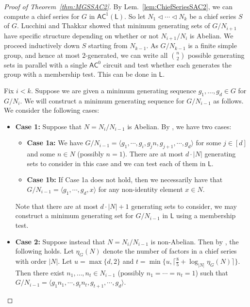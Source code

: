 \documentclass{theoretics}
\newcommand{\Lem}[1]{Lem.~\ref{#1}\xspace}
\newcommand*{\ComplexityClass}[1]{\ensuremath{\mathsf{#1}}\xspace}
\newcommand*{\LogSpace}{\ComplexityClass{L}}
\newcommand{\AC}{\ComplexityClass{AC}}
\begin{document}
\begin{proof}[Proof of Theorem~\ref{thm:MGSSAC2}]
By \Lem{lem:ChiefSeriesSAC2}, we can compute a chief series for $G$ in $\AC^{1}(\LogSpace)$. So let $N_1 \triangleleft \cdots \triangleleft N_k$ be a chief series $S$ of $G$.  Lucchini and Thakkar \cite{LucchiniThakkar} showed that minimum generating sets of $G / N_{i+1}$ have specific structure depending on whether or not $N_{i+1}/N_{i}$ is Abelian. We proceed inductively down $S$ starting from $N_{k-1}$. As $G / N_{k-1}$ is a finite simple group, and hence at most $2$-generated, we can write all $\binom{n}{2}$ possible generating sets in parallel with a single $\AC^0$ circuit and test whether each generates the group with a membership test. This can be done in $\LogSpace$. 

Fix $i < k$. Suppose we are given a minimum generating sequence $g_{1}, \ldots, g_{d} \in G$ for $G/N_{i}$. We will construct a minimum generating sequence for $G/N_{i-1}$ as follows. We consider the following cases:
\begin{itemize}
\item \textbf{Case 1:} Suppose that $N = N_{i}/N_{i-1}$ is Abelian. By \cite[Theorem~4]{LucchiniMenegazzo}, we have two cases: 
\begin{itemize}

\item \textbf{Case 1a:} We have $G/N_{i-1} = \langle g_1, \cdots, g_i, g_j n, g_{j+1}, \cdots, g_d \rangle$ for some $j \in [d]$ and some $n \in N$ (possibly $n = 1$). There are at most $d \cdot |N|$ generating sets to consider in this case and we can test each of them in $\LogSpace$. 

\item \textbf{Case 1b:} If Case 1a does not hold, then we necessarily have that \\ $G/N_{i-1} = \langle g_1, \cdots, g_d, x \rangle$ for any non-identity element $x \in N$.
\end{itemize}

Note that there are at most $d \cdot |N| + 1$ generating sets to consider, we may construct a minimum generating set for $G/N_{i-1}$ in $\LogSpace$ using a membership test.

\item \textbf{Case 2:} Suppose instead that $N = N_{i}/N_{i-1}$ is non-Abelian. Then by \cite[Corollary 13]{LucchiniThakkar}, the following holds. Let $\eta_{G}(N)$ denote the number of factors in a chief series with order $|N|$. Let $u = \max\{d, 2\}$ and $t = \min\{u, \lceil \frac{8}{5} + \log_{\lvert N \rvert}\eta_G(N) \rceil\}$. Then there exist $n_{1}, \ldots, n_{t} \in N_{i-1}$ (possibly $n_1 = \cdots = n_t = 1$) such that $G/N_{i-1} = \langle g_1n_1, \cdots, g_tn_t, g_{t+1}, \cdots, g_d \rangle$.


\end{itemize}
\end{proof}
\end{document}
